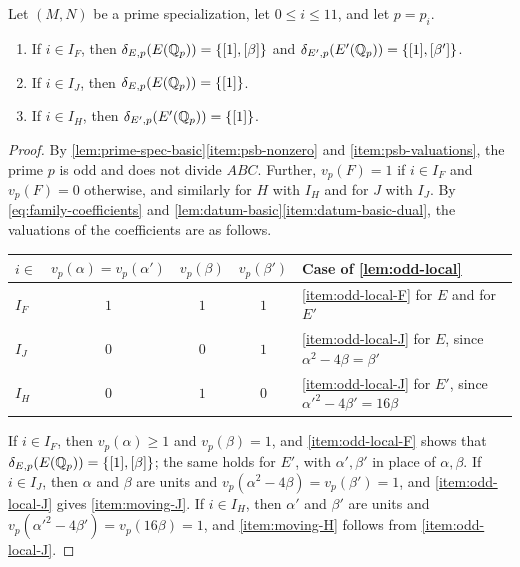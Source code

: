 \begin{lemma}\label{lem:moving-images}
Let $(M,N)$ be a prime specialization, let $0\le i\le11$, and let $p=p_i$.
\begin{enumerate}[label=(\alph*),ref=(\alph*)]
\item\label{item:moving-F} If $i\in I_F$, then $\delta_{E,p}(E(\mathbb Q_p))=\{[1],[\beta]\}$ and $\delta_{E',p}(E'(\mathbb Q_p))=\{[1],[\beta']\}$.
\item\label{item:moving-J} If $i\in I_J$, then $\delta_{E,p}(E(\mathbb Q_p))=\{[1]\}$.
\item\label{item:moving-H} If $i\in I_H$, then $\delta_{E',p}(E'(\mathbb Q_p))=\{[1]\}$.
\end{enumerate}
\end{lemma}

\begin{proof}
By \cref{lem:prime-spec-basic}\ref{item:psb-nonzero} and \ref{item:psb-valuations}, the prime $p$ is odd and does not divide $ABC$. Further, $v_p(F)=1$ if $i\in I_F$ and $v_p(F)=0$ otherwise, and similarly for $H$ with $I_H$ and for $J$ with $I_J$. By \eqref{eq:family-coefficients} and \cref{lem:datum-basic}\ref{item:datum-basic-dual}, the valuations of the coefficients are as follows.
\begin{center}
\begin{tabular}{lcccl}
\toprule
$i\in$ & $v_p(\alpha)=v_p(\alpha')$ & $v_p(\beta)$ & $v_p(\beta')$ & Case of \cref{lem:odd-local}\\
\midrule
$I_F$ & $1$ & $1$ & $1$ & \ref{item:odd-local-F} for $E$ and for $E'$\\
$I_J$ & $0$ & $0$ & $1$ & \ref{item:odd-local-J} for $E$, since $\alpha^2-4\beta=\beta'$\\
$I_H$ & $0$ & $1$ & $0$ & \ref{item:odd-local-J} for $E'$, since $\alpha'^2-4\beta'=16\beta$\\
\bottomrule
\end{tabular}
\end{center}
If $i\in I_F$, then $v_p(\alpha)\ge1$ and $v_p(\beta)=1$, and \cref{item:odd-local-F} shows that $\delta_{E,p}(E(\mathbb Q_p))=\{[1],[\beta]\}$; the same holds for $E'$, with $\alpha',\beta'$ in place of $\alpha,\beta$. If $i\in I_J$, then $\alpha$ and $\beta$ are units and $v_p(\alpha^2-4\beta)=v_p(\beta')=1$, and \cref{item:odd-local-J} gives \ref{item:moving-J}. If $i\in I_H$, then $\alpha'$ and $\beta'$ are units and $v_p(\alpha'^2-4\beta')=v_p(16\beta)=1$, and \ref{item:moving-H} follows from \cref{item:odd-local-J}.
\end{proof}

